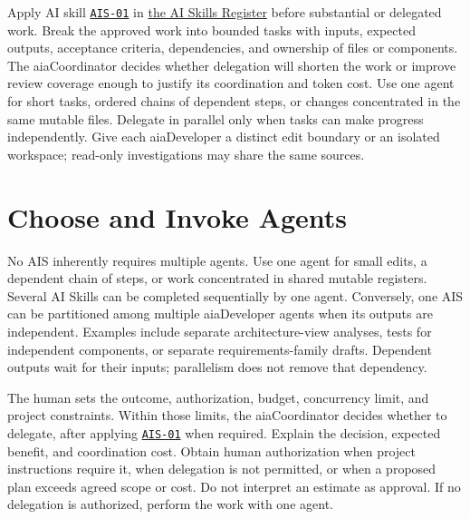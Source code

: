 Apply AI skill \hyperref[Skill:AIS-01]{\texttt{AIS-01}} in
\hyperref[Table:AISkills]{the AI Skills Register} before substantial or
delegated work. Break the approved work into bounded tasks with inputs, expected outputs,
acceptance criteria, dependencies, and ownership of files or components. The
aiaCoordinator decides whether delegation will shorten the work or improve review
coverage enough to justify its coordination and token cost. Use one agent for
short tasks, ordered chains of dependent steps, or changes concentrated in the
same mutable files. Delegate in parallel only when tasks can make progress
independently. Give each aiaDeveloper a distinct edit boundary or an isolated
workspace; read-only investigations may share the same sources.

\section{Choose and Invoke Agents}
\label{Section:AIAgentDelegation}
No AIS inherently requires multiple agents. Use one agent for small edits,
a dependent chain of steps, or work concentrated in shared mutable registers.
Several AI Skills can be completed sequentially by one agent. Conversely, one AIS
can be partitioned among multiple aiaDeveloper agents when its outputs are independent.
Examples include separate architecture-view analyses, tests for independent
components, or separate requirements-family drafts. Dependent outputs wait
for their inputs; parallelism does not remove that dependency.

The human sets the outcome, authorization, budget, concurrency limit, and
project constraints. Within those limits, the aiaCoordinator decides whether to
delegate, after applying \hyperref[Skill:AIS-01]{\texttt{AIS-01}} when required. Explain the decision,
expected benefit, and coordination cost. Obtain human authorization when
project instructions require it, when delegation is not permitted, or when a
proposed plan exceeds agreed scope or cost. Do not interpret an estimate as
approval. If no delegation is authorized, perform the work with one agent.

